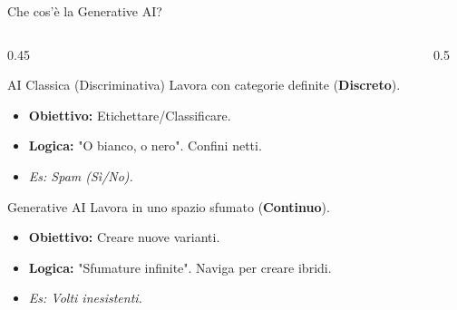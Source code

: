 \documentclass[aspectratio=169, 10pt]{beamer}
\begin{document}
\begin{frame}{Che cos'è la Generative AI?}

    \begin{columns}[c] 

        \begin{column}{0.45\textwidth}
            \begin{block}{AI Classica (Discriminativa)}
                \scriptsize %
                Lavora con categorie definite (\textbf{Discreto}).
                \begin{itemize}
                    \item \textbf{Obiettivo:} Etichettare/Classificare.
                    \item \textbf{Logica:} "O bianco, o nero". Confini netti.
                    \item \textit{Es: Spam (Sì/No).}
                \end{itemize}
            \end{block}

            \vspace{0.5em}

            \begin{block}{Generative AI}
                \scriptsize
                Lavora in uno spazio sfumato (\textbf{Continuo}).
                \begin{itemize}
                    \item \textbf{Obiettivo:} Creare nuove varianti.
                    \item \textbf{Logica:} "Sfumature infinite". Naviga per creare ibridi.
                    \item \textit{Es: Volti inesistenti.}
                \end{itemize}
            \end{block}
        \end{column}

        \begin{column}{0.5\textwidth}
            \centering
            
            \begin{tikzpicture}[scale=0.68, transform shape]
                

\end{tikzpicture}
\end{column}
\end{columns}
\end{frame}
\end{document}
